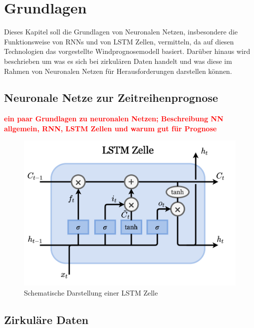 \documentclass[
12pt, %
toc=listofnumbered, %
toc=chapterentrydotfill, %
numbers=noenddot, %
captions=tableheading, %
bibliography=numbered
]{scrreprt}
\let\Oldsection\section
\renewcommand{\section}{\FloatBarrier\Oldsection}
\newcommand{\highlight}[1]{\textbf{\textcolor{red}{#1}}}
\begin{document}
\chapter{Grundlagen}
Dieses Kapitel soll die Grundlagen von Neuronalen Netzen, insbesondere die Funktionsweise von RNNs und von LSTM Zellen, vermitteln, da auf diesen Technologien das vorgestellte Windprognosemodell basiert. 
Darüber hinaus wird beschrieben um was es sich bei zirkulären Daten handelt und was diese im Rahmen von Neuronalen Netzen für Herausforderungen darstellen können.

\section{Neuronale Netze zur Zeitreihenprognose}
\highlight{ein paar Grundlagen zu neuronalen Netzen; 
Beschreibung NN allgemein, RNN, LSTM Zellen und warum gut für Prognose}


\begin{figure}[tph]
	\begin{center}
		\includegraphics[width=0.5\linewidth]{./images/LSTM_Zelle.png}
		\caption{Schematische Darstellung einer LSTM Zelle}
		\label{fig:lstm}
	\end{center}
\end{figure}

\newpage

\section{Zirkuläre Daten}\label{section:circ_data}
\end{document}
